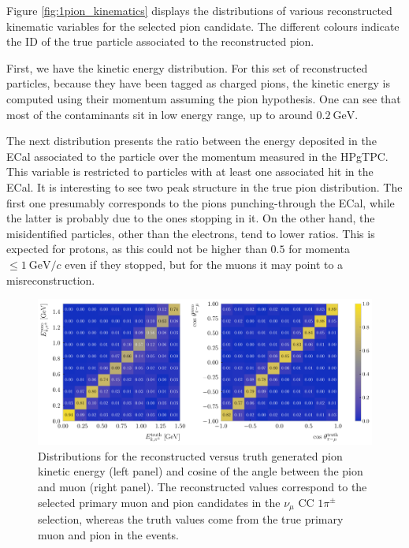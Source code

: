 Figure \ref{fig:1pion_kinematics} displays the distributions of various reconstructed kinematic variables for the selected pion candidate. The different colours indicate the ID of the true particle associated to the reconstructed pion.

First, we have the kinetic energy distribution. For this set of reconstructed particles, because they have been tagged as charged pions, the kinetic energy is computed using their momentum assuming the pion hypothesis. One can see that most of the contaminants sit in low energy range, up to around $0.2~\mathrm{GeV}$.

The next distribution presents the ratio between the energy deposited in the ECal associated to the particle over the momentum measured in the HPgTPC. This variable is restricted to particles with at least one associated hit in the ECal. It is interesting to see two peak structure in the true pion distribution. The first one presumably corresponds to the pions punching-through the ECal, while the latter is probably due to the ones stopping in it. On the other hand, the misidentified particles, other than the electrons, tend to lower ratios. This is expected for protons, as this could not be higher than $0.5$ for momenta $\leq 1~\mathrm{GeV}/c$ even if they stopped, but for the muons it may point to a misreconstruction.

\begin{figure}[t]
    \centering
    \includegraphics[width=.99\linewidth]{Images/GAr_selection/pion_selection_1pion_kinematic_comp.pdf}
    \caption[Distributions for the reconstructed versus truth pion kinetic energy and angle between the pion and muon in the $\nu_{\mu}$ CC $1\pi^{\pm}$ selection.]{Distributions for the reconstructed versus truth generated pion kinetic energy (left panel) and cosine of the angle between the pion and muon (right panel). The reconstructed values correspond to the selected primary muon and pion candidates in the $\nu_{\mu}$ CC $1\pi^{\pm}$ selection, whereas the truth values come from the true primary muon and pion in the events.}
    \label{fig:1pion_kinematic_comp}
\end{figure}

